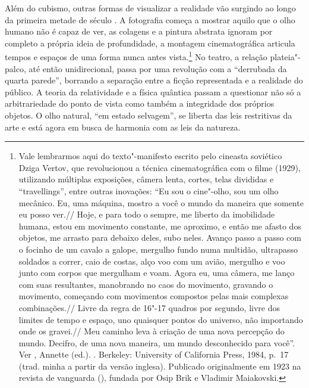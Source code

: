 Além do cubismo, outras formas de visualizar a realidade vão surgindo ao
longo da primeira metade de século . A fotografia começa a mostrar  aquilo que o olho humano não é capaz de ver, as colagens e a pintura abstrata ignoram por completo a própria ideia de profundidade, a montagem cinematográfica articula tempos e espaços de uma forma nunca antes vista.\footnote{Vale lembrarmos aqui do texto"-manifesto escrito pelo cineasta soviético Dziga Vertov, que revolucionou a técnica \label{vertov} cinematográfica com o filme {} (1929), utilizando múltiplas exposições, câmera lenta, cortes, telas divididas e ``travellings'', entre outras inovações: ``Eu sou o cine"-olho, sou um olho mecânico. Eu, uma máquina, mostro a você o mundo da maneira que somente eu posso ver.// Hoje, e para todo o sempre, me liberto da imobilidade humana, estou em movimento constante, me aproximo, e então me afasto dos objetos, me arrasto para debaixo deles, subo neles. Avanço passo a passo com o focinho de um cavalo a galope, mergulho fundo numa multidão, ultrapasso soldados a correr, caio de costas, alço voo com um avião, mergulho e voo junto com corpos que mergulham e voam. Agora eu, uma câmera, me lanço com suas resultantes, manobrando no caos do movimento, gravando o movimento, começando com movimentos compostos pelas mais complexas combinações.// Livre da regra de 16"-17 quadros por segundo, livre dos limites de tempo e espaço, uno quaisquer pontos do universo, não importando onde os gravei.// Meu caminho leva à criação de uma nova percepção do mundo. Decifro, de uma nova maneira, um mundo desconhecido para você''. Ver , Annette (ed.). {}. Berkeley: University of California Press, 1984, p.~17 (trad. minha a partir da versão inglesa). Publicado originalmente em 1923 na revista de vanguarda {} ({}), fundada por Osip Brik e Vladimir Maiakovski.} No
teatro, a relação plateia"-palco, até então unidirecional, passa por uma
revolução com a ``derrubada da quarta parede'', borrando a separação
entre a ficção representada e a realidade do público. A teoria da
relatividade e a física quântica passam a questionar não só a
arbitrariedade do ponto de vista como também a integridade dos próprios
objetos. O olho natural, ``em estado selvagem'', se liberta das leis
restritivas da arte e está agora em busca de harmonia com as leis da
natureza.

